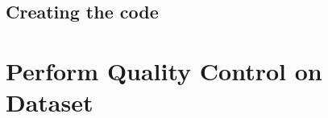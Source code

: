         \subsection{Creating the code}
        
    
    
    \section{Perform Quality Control on Dataset}


